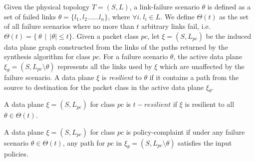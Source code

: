 Given the physical topology $T=(S,L)$, a link-failure
scenario $\theta$ is defined as a set of failed links $\theta = \{l_1, l_2 \ldots ... l_n\}$,
where $\forall i.\ l_i \in L$.
	We define $\Theta(t)$ as the set of all failure scenarios where no more than $t$
	arbitrary links fail, i.e. $\Theta(t) = \{ \ \theta \ \ | \ \ |\theta| \leq t\}$.
Given a packet class $pc$,
let $\xi = (S, L_{pc})$ be the induced data plane graph constructed from the links
of the paths returned by the synthesis algorithm for class $pc$.
 For a failure scenario
$\theta$, the active data plane $\xi_\theta = (S, L_{pc} \setminus \theta)$ represents
all the links used by $\xi$ which are unaffected by the failure scenario. A data
plane $\xi$ is {\em resilient} to $\theta$ if it contains a path from the source to 
destination for the packet class in the active data plane $\xi_\theta$.
\begin{mydef}[Resilience]
	A data plane $\xi = (S, L_{pc})$ for class $pc$ is $t-resilient$ if $\xi$ is 
	resilient to all $\theta \in \Theta(t)$.
\end{mydef}
\begin{mydef}
	A data plane $\xi = (S, L_{pc})$ for class $pc$ is policy-complaint if under
	any failure scenario $\theta \in \Theta(t)$, any path for $pc$ in 
	$\xi_\theta=(S, L_{pc} \setminus \theta)$ satisfies the input policies. 
\end{mydef}
